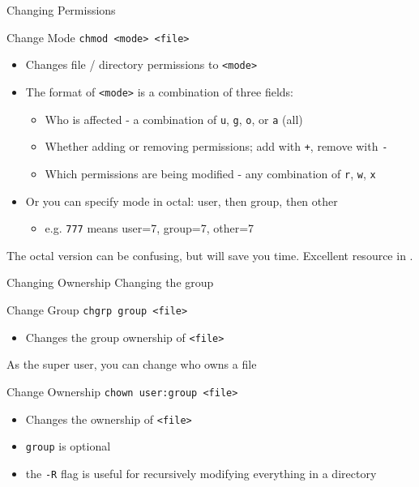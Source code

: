 \documentclass[11pt]{beamer}
\newcommand{\colbf}[1]{\textcolor{mLightBrown!77!black}{#1}}%
\begin{document}
\begin{frame}[fragile]{Changing Permissions}
  \begin{block}{\colbf{Ch}ange \colbf{Mod}e}
    \texttt{chmod <mode> <file>}
    \begin{itemize}
      \item Changes file / directory permissions to \texttt{<mode>}
      \item The format of \texttt{<mode>} is a combination of three fields:
      \begin{itemize}
        \item Who is affected \-- a combination of \texttt{u}, \texttt{g}, \texttt{o}, or \texttt{a} (all)
        \item Whether adding or removing permissions; add with \texttt{+}, remove with \texttt{-}
        \item Which permissions are being modified \-- any combination of \texttt{r}, \texttt{w}, \texttt{x}
      \end{itemize}
      \item Or you can specify mode in octal: user, then group, then other
      \begin{itemize}
        \item e.g. \texttt{777} means user=7, group=7, other=7
      \end{itemize}
    \end{itemize}
  \end{block}
  The octal version can be confusing, but will save you time.  Excellent resource in \cite{chmod}.
\end{frame}

\begin{frame}[fragile]{Changing Ownership}
  Changing the group
  \begin{block}{\colbf{Ch}ange \colbf{Gr}ou\colbf{p}}
    \texttt{chgrp group <file>}
    \begin{itemize}
      \item Changes the group ownership of \texttt{<file>}
    \end{itemize}
  \end{block}

  As the super user, you can change who owns a file

  \begin{block}{\colbf{Ch}ange \colbf{Own}ership}
    \texttt{chown user:group <file>}
    \begin{itemize}
      \item Changes the ownership of \texttt{<file>}
      \item \texttt{group} is optional
      \item the \texttt{-R} flag is useful for recursively modifying everything in a directory
    \end{itemize}
  \end{block}
\end{frame}
\end{document}
